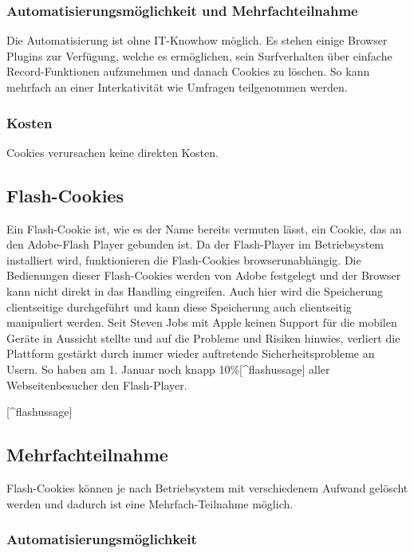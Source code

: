 \subsubsection{Automatisierungsmöglichkeit und
Mehrfachteilnahme}\label{automatisierungsmuxf6glichkeit-und-mehrfachteilnahme}

Die Automatisierung ist ohne IT-Knowhow möglich. Es stehen einige
Browser Plugins zur Verfügung, welche es ermöglichen, sein Surfverhalten
über einfache Record-Funktionen aufzunehmen und danach Cookies zu
löschen. So kann mehrfach an einer Interkativität wie Umfragen
teilgenommen werden.

\subsubsection{Kosten}\label{kosten}

Cookies verursachen keine direkten Kosten.

\subsection{Flash-Cookies}\label{flash-cookies}

Ein Flash-Cookie ist, wie es der Name bereits vermuten lässt, ein
Cookie, das an den Adobe-Flash Player gebunden ist. Da der Flash-Player
im Betriebsystem installiert wird, funktionieren die Flash-Cookies
browserunabhängig. Die Bedienungen dieser Flash-Cookies werden von Adobe
festgelegt und der Browser kann nicht direkt in das Handling eingreifen.
Auch hier wird die Speicherung clientseitige durchgeführt und kann diese
Speicherung auch clientseitig manipuliert werden. Seit Steven Jobs mit
Apple keinen Support für die mobilen Geräte in Aussicht stellte und auf
die Probleme und Risiken hinwies, verliert die Plattform gestärkt durch
immer wieder auftretende Sicherheitsprobleme an Usern. So haben am 1.
Januar noch knapp 10\%{[}\^{}flashussage{]} aller Webseitenbesucher den
Flash-Player.

{[}\^{}flashussage{]}\autocite{flashussage}

\subsection{Mehrfachteilnahme}\label{mehrfachteilnahme}

Flash-Cookies können je nach Betriebsystem mit verschiedenem Aufwand
gelöscht werden und dadurch ist eine Mehrfach-Teilnahme möglich.

\subsubsection{Automatisierungsmöglichkeit}\label{automatisierungsmuxf6glichkeit}

